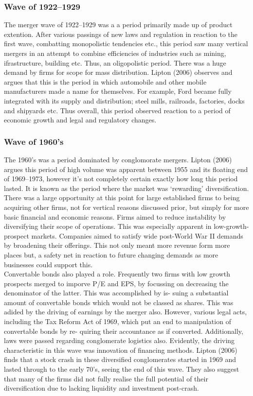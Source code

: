 \documentclass[11pt, english]{article}
\begin{document}
                \subsubsection*{Wave of 1922--1929}

        The merger wave of 1922--1929 was a a period primarily made up of product extention. After various passings of new laws and regulation in reaction to the first wave, combatting monopolistic tendencies etc., this period saw many vertical mergers in an attempt to combine efficiencies of industries such as mining, ifrastructure, building etc. Thus, an oligopolistic period. There was a huge demand by firms for scope for mass distribution. Lipton (2006) observes and argues that this is the period in which automobile and other mobile manufacturers made a name for themselves. For example, Ford became fully integrated with its supply and distribution; steel mills, railroads, factories, docks and shipyards etc. Thus overall, this period observed reaction to a period of economic growth and legal and regulatory changes.

                \subsubsection*{Wave of 1960's}

	The 1960's was a period dominated by conglomorate mergers. Lipton (2006) argues this period of high volume was apparent between 1955 and its floating end of 1969--1973, however it's not completely certain exactly how long this period lasted. It is known as the period where the market was ‘rewarding’ diversification. There was a large opportunity at this point for large established firms to being acquiring other firms, not for vertical reasons discussed prior, but simply for more basic financial and economic reasons. Firms aimed to reduce instability by diversifying their scope of operations. This was especially apparent in low-growth-prospect markets. Companies aimed to satisfy wide post-World War II demands by broadening their offerings. This not only meant more revenue form more places but, a safety net in reaction to future changing demands as more businesses could support this.\\

	Convertable bonds also played a role. Frequently two firms with low growth prospects merged to imporve P/E and EPS, by focussing on decreasing the denominator of the latter. This was accomplished by is- suing a substantial amount of convertable bonds which would not be classed as shares. This was adided by the driving of earnings by the merger also. However, various legal acts, including the Tax Reform Act of 1969, which put an end to manipulation of convertable bonds by re- quiring their accountance as if converted. Additionally, laws were passed regarding conglomerate logistics also. Evidently, the driving characteristic in this wave was innovation of financing methods. Lipton (2006) finds that a stock crash in these diversified conglomerates started in 1969 and lasted through to the early 70's, seeing the end of this wave. They also suggest that many of the firms did not fully realise the full potential of their diversification due to lacking liquidity and investment post-crash.
\end{document}
